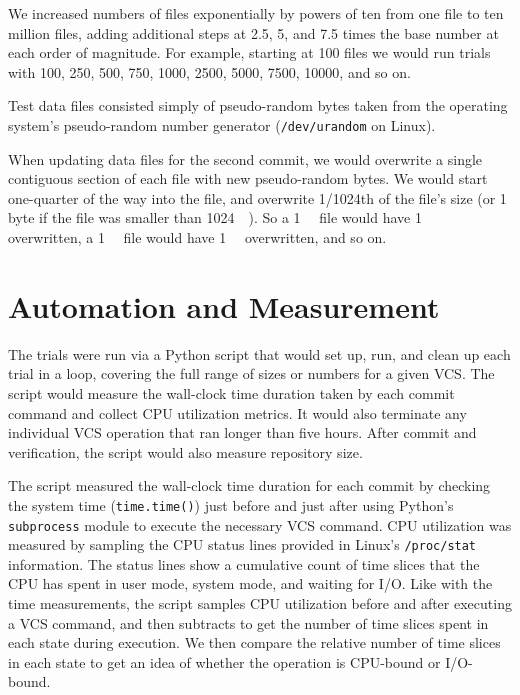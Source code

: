 We increased numbers of files exponentially by powers of ten from one file to
ten million files, adding additional steps at \num{2.5}, \num{5}, and \num{7.5}
times the base number at each order of magnitude. For example, starting at
\num{100} files we would run trials with \num{100}, \num{250}, \num{500},
\num{750}, \num{1000}, \num{2500}, \num{5000}, \num{7500}, \num{10000}, and so
on.

Test data files consisted simply of pseudo-random bytes taken from the operating
system's pseudo-random number generator (\lstinline{/dev/urandom} on Linux).

When updating data files for the second \gls{commit}, we would overwrite a
single contiguous section of each file with new pseudo-random bytes. We would
start one-quarter of the way into the file, and overwrite \num{1/1024}th of the
file's size (or 1 byte if the file was smaller than \SI{1024}{\kibi\byte}). So a
\SI{1}{\mebi\byte} file would have \SI{1}{\kibi\byte} overwritten, a
\SI{1}{\gibi\byte} file would have \SI{1}{\mebi\byte} overwritten, and so on.


\section{Automation and Measurement}

The trials were run via a Python script that would set up, run, and clean up
each trial in a loop, covering the full range of sizes or numbers for a given
VCS. The script would measure the wall-clock time duration taken by each
\gls{commit} command and collect CPU utilization metrics. It would also
terminate any individual VCS operation that ran longer than five hours. After
\gls{commit} and verification, the script would also measure repository size.

The script measured the wall-clock time duration for each \gls{commit} by
checking the system time (\lstinline{time.time()}) just before and just after
using Python's \lstinline{subprocess} module to execute the necessary VCS
command. CPU utilization was measured by sampling the CPU status lines provided
in Linux's \lstinline{/proc/stat} information. The status lines show a
cumulative count of time slices that the CPU has spent in user mode, system
mode, and waiting for I/O. Like with the time measurements, the script samples
CPU utilization before and after executing a VCS command, and then subtracts to
get the number of time slices spent in each state during execution. We then
compare the relative number of time slices in each state to get an idea of
whether the operation is CPU-bound or I/O-bound.

